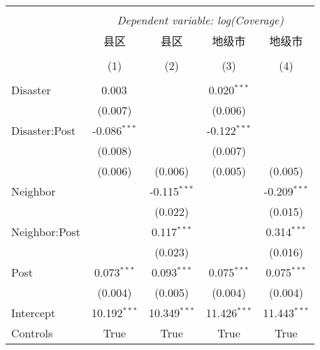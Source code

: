 
\begin{tabular}{@{\extracolsep{5pt}}lcccc}
\\[-1.8ex]\hline
\hline \\[-1.8ex]
& \multicolumn{4}{c}{\textit{Dependent variable: log(Coverage)}} \
\cr \cline{2-5}
\\[-1.8ex] & \multicolumn{1}{c}{县区} & \multicolumn{1}{c}{县区} & \multicolumn{1}{c}{地级市} & \multicolumn{1}{c}{地级市}  \\
\\[-1.8ex] & (1) & (2) & (3) & (4) \\
\hline \\[-1.8ex]
 Disaster & 0.003$^{}$ & & 0.020$^{***}$ & \\
& (0.007) & & (0.006) & \\
 Disaster:Post & -0.086$^{***}$ & & -0.122$^{***}$ & \\
& (0.008) & & (0.007) & \\
& (0.006) & (0.006) & (0.005) & (0.005) \\
 Neighbor & & -0.115$^{***}$ & & -0.209$^{***}$ \\
& & (0.022) & & (0.015) \\
 Neighbor:Post & & 0.117$^{***}$ & & 0.314$^{***}$ \\
& & (0.023) & & (0.016) \\
 Post & 0.073$^{***}$ & 0.093$^{***}$ & 0.075$^{***}$ & 0.075$^{***}$ \\
& (0.004) & (0.005) & (0.004) & (0.004) \\
Intercept & 10.192$^{***}$ & 10.349$^{***}$ & 11.426$^{***}$ & 11.443$^{***}$ \\
Controls & True & True & True & True \\

\end{tabular}
